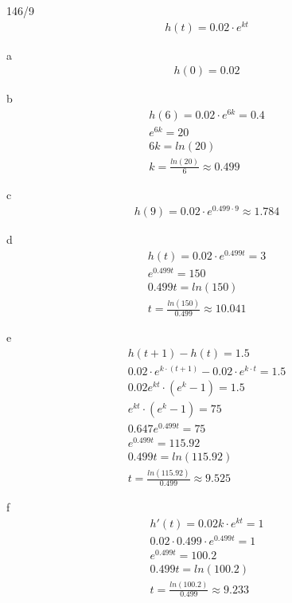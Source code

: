 \begin{exercise}{146/9}
  \begin{gather*}
    h(t) = 0.02 \cdot e^{kt}
  \end{gather*}
  \item [a]
  \begin{gather*}
    h(0) = 0.02
  \end{gather*}
  \item [b]
  \begin{gather*}
    h(6) = 0.02 \cdot e^{6k} = 0.4 \\
    e^{6k} = 20 \\
    6k = ln(20) \\
    k = \frac{ln(20)}{6} \approx 0.499
  \end{gather*}
  \item [c]
  \begin{gather*}
    h(9) = 0.02 \cdot e^{0.499 \cdot 9} \approx 1.784
  \end{gather*}
  \item [d]
  \begin{gather*}
    h(t) = 0.02 \cdot e^{0.499t} = 3 \\
    e^{0.499t} = 150 \\
    0.499t = ln(150) \\
    t = \frac{ln(150)}{0.499} \approx 10.041
  \end{gather*}
  \item [e]
  \begin{gather*}
    h(t + 1) - h(t) = 1.5 \\
    0.02 \cdot e^{k \cdot (t + 1)} - 0.02 \cdot e^{k \cdot t} = 1.5 \\
    0.02e^{kt} \cdot (e^k - 1) = 1.5 \\
    e^{kt} \cdot (e^k - 1) = 75 \\
    0.647e^{0.499t} = 75 \\
    e^{0.499t} = 115.92 \\
    0.499t = ln(115.92) \\
    t = \frac{ln(115.92)}{0.499} \approx 9.525
  \end{gather*}
  \item [f]
  \begin{gather*}
    h'(t) = 0.02k \cdot e^{kt} = 1 \\
    0.02 \cdot 0.499 \cdot e^{0.499t} = 1 \\
    e^{0.499t} = 100.2 \\
    0.499t = ln(100.2) \\
    t = \frac{ln(100.2)}{0.499} \approx 9.233

\end{gather*}
\end{exercise}
